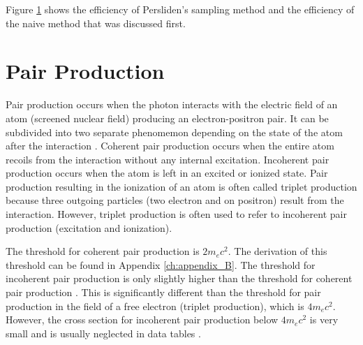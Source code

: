 Figure \ref{} shows the efficiency of Persliden's sampling method and 
the efficiency of the naive method that was discussed first. 

\section{Pair Production}
Pair production occurs when the photon interacts with the electric field of an
atom (screened nuclear field) producing an electron-positron pair. It can be
subdivided into two separate phenomemon depending on the state of the atom
after the interaction \citep{hubbell_pair_1980}. Coherent pair production occurs
when the entire atom recoils from the interaction without any internal 
excitation. Incoherent pair production occurs when the atom is left in an 
excited or ionized state. Pair production resulting in the ionization of an 
atom is often called triplet production because three outgoing particles (two 
electron and on positron) result from the interaction. However, triplet 
production is often used to refer to incoherent pair production (excitation and
ionization). 

The threshold for coherent pair production is $2m_ec^2$. The derivation of this
threshold can be found in Appendix \ref{ch:appendix_B}. The threshold for 
incoherent pair production is only slightly higher than the threshold for 
coherent pair production \citep{hubbell_pair_1980}. This is significantly 
different than the threshold for pair production in the field of a free 
electron (triplet production), which is $4m_ec^2$. However, the cross section 
for incoherent pair production below $4m_ec^2$ is very small and is usually 
neglected in data tables \citep{hubbell_pair_1980}. 

